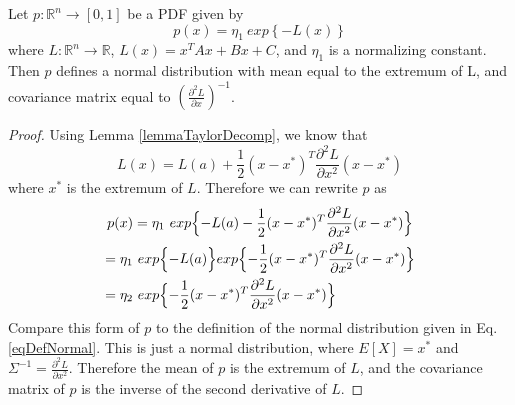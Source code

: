 \begin{lemma} 
	\label{lemmaHessianInverse}
	Let \(p: \mathbb{R}^n \to [0,1]\) be a PDF given by \[
	p(x) = \eta_1\ exp\left\{ - L(x) \right\}
	\]
	where \(L: \mathbb{R}^n \to \mathbb{R}\), \(L(x) = x^T Ax + Bx + C\), and \(\eta_1\) is a normalizing constant. Then \(p\) defines a normal distribution with mean equal to the extremum of L, and covariance matrix equal to \((\frac{\partial^2 L}{\partial x})^{-1}\).
\end{lemma}
\begin{proof}
	Using Lemma \ref{lemmaTaylorDecomp}, we know that \[
	L(x) = L(a) + \frac{1}{2} (x-x^*)^T \frac{\partial^2 L}{\partial x^2} (x-x^*)
	\] where \(x^*\) is the extremum of \(L\).
	Therefore we can rewrite \(p\) as
	\begin{multline*}
	p(x) = \eta_1\ exp\Bigl\{ -L(a) - \frac{1}{2} (x-x^*)^T \frac{\partial^2 L}{\partial x^2} (x-x^*)\Bigr\} \\
	= \eta_1\ exp \Bigl\{ -L(a) \Bigr\} exp \Bigl\{ - \frac{1}{2} (x-x^*)^T \frac{\partial^2 L}{\partial x^2} (x-x^*)\Bigr\} \\
	= \eta_2\ exp \Bigl\{ - \frac{1}{2} (x-x^*)^T \frac{\partial^2 L}{\partial x^2} (x-x^*)\Bigr\} \hfill
	\end{multline*}
	Compare this form of \(p\) to the definition of the normal distribution given in Eq. \ref{eqDefNormal}. This is just a normal distribution, where \(E[X] = x^*\) and \(\Sigma^{-1} = \frac{\partial^2 L}{\partial x^2}\). Therefore the mean of \(p\) is the extremum of \(L\), and the covariance matrix of \(p\) is the inverse of the second derivative of \(L\). 
\end{proof}

